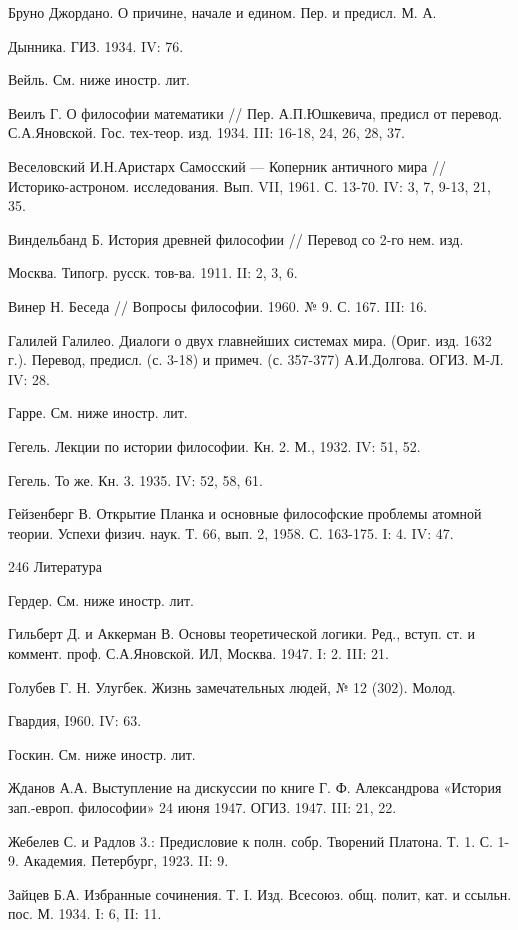 Бруно Джордано. О причине, начале и едином. Пер. и предисл. М. А.

Дынника. ГИЗ. 1934. IV: 76.

Вейль. См. ниже иностр. лит.

Веилъ Г. О философии математики // Пер. А.П.Юшкевича, предисл от
перевод. С.А.Яновской. Гос. тех-теор. изд. 1934. III: 16-18, 24, 26,
28, 37.

Веселовский И.Н.Аристарх Самосский --- Коперник античного мира //
Историко-астроном. исследования. Вып. VII, 1961. С. 13-70. IV: 3, 7,
9-13, 21, 35.

Виндельбанд Б. История древней философии // Перевод со 2-го нем. изд.

Москва. Типогр. русск. тов-ва. 1911. II: 2, 3, 6.

Винер Н. Беседа // Вопросы философии. 1960. № 9. С. 167. III: 16.

Галилей Галилео. Диалоги о двух главнейших системах мира. (Ориг. изд.
1632 г.). Перевод, предисл. (с. 3-18) и примеч. (с. 357-377)
А.И.Долгова. ОГИЗ. М-Л. IV: 28.

Гарре. См. ниже иностр. лит.

Гегель. Лекции по истории философии. Кн. 2. М., 1932. IV: 51, 52.

Гегель. То же. Кн. 3. 1935. IV: 52, 58, 61.

Гейзенберг В. Открытие Планка и основные философские проблемы атомной
теории. Успехи физич. наук. Т. 66, вып. 2, 1958. С. 163-175. I: 4.
IV: 47.

246 Литература

Гердер. См. ниже иностр. лит.

Гильберт Д. и Аккерман В. Основы теоретической логики. Ред., вступ.
ст. и коммент. проф. С.А.Яновской. ИЛ, Москва. 1947. I: 2. III: 21.

Голубев Г. Н. Улугбек. Жизнь замечательных людей, № 12 (302). Молод.

Гвардия, I960. IV: 63.

Госкин. См. ниже иностр. лит.

Жданов А.А. Выступление на дискуссии по книге Г. Ф. Александрова
«История зап.-европ. философии» 24 июня 1947. ОГИЗ. 1947. III: 21, 22.

Жебелев С. и Радлов 3.: Предисловие к полн. собр. Творений Платона. Т.
1. С. 1-9. Академия. Петербург, 1923. II: 9.

Зайцев Б.А. Избранные сочинения. Т. I. Изд. Всесоюз. общ. полит, кат.
и ссыльн. пос. М. 1934. I: 6, II: 11.

